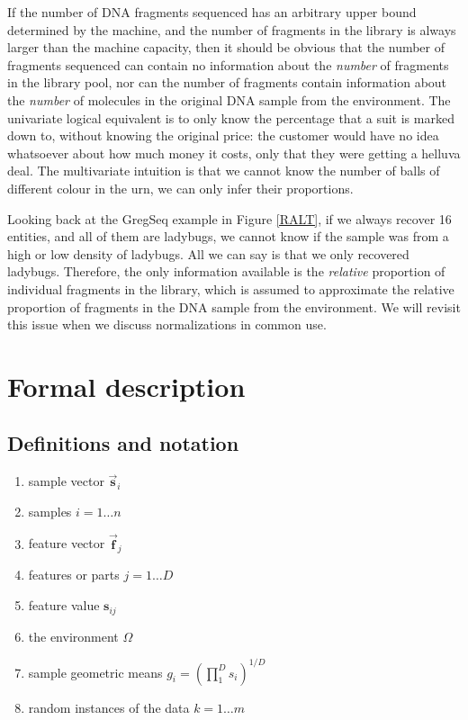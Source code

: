 \documentclass[onecolumn]{book}
\providecommand{\tightlist}{%
  \setlength{\itemsep}{0pt}\setlength{\parskip}{0pt}}
\newcommand{\vect}[1]{\vec{\textbf{#1}}}
\theoremstyle{definition}
\theoremstyle{definition}
\theoremstyle{definition}
\theoremstyle{remark}
\begin{document}
If the number of DNA fragments sequenced has an arbitrary upper bound
determined by the machine, and the number of fragments in the library is
always larger than the machine capacity, then it should be obvious that
the number of fragments sequenced can contain no information about the
\emph{number} of fragments in the library pool, nor can the number of
fragments contain information about the \emph{number} of molecules in
the original DNA sample from the environment. The univariate logical
equivalent is to only know the percentage that a suit is marked down to,
without knowing the original price: the customer would have no idea
whatsoever about how much money it costs, only that they were getting a
helluva deal. The multivariate intuition is that we cannot know the
number of balls of different colour in the urn, we can only infer their
proportions.

Looking back at the GregSeq example in Figure \ref{RALT}, if we always
recover 16 entities, and all of them are ladybugs, we cannot know if the
sample was from a high or low density of ladybugs. All we can say is
that we only recovered ladybugs. Therefore, the only information
available is the \emph{relative} proportion of individual fragments in
the library, which is assumed to approximate the relative proportion of
fragments in the DNA sample from the environment. We will revisit this
issue when we discuss normalizations in common use.

\hypertarget{formal-description}{%
\section{Formal description}\label{formal-description}}

\hypertarget{definitions-and-notation}{%
\subsection{Definitions and notation}\label{definitions-and-notation}}

\begin{enumerate}
\def\labelenumi{\arabic{enumi}.}
\tightlist
\item
  sample vector \(\vect{s}_i\)
\item
  samples \(i=1 \ldots n\)
\item
  feature vector \(\vect{f}_j\)
\item
  features or parts \(j=1 \ldots D\)
\item
  feature value \(\textbf{s}_{ij}\)
\item
  the environment \(\Omega\)
\item
  sample geometric means \(g_i= ( \prod_{1}^{D} s_i )^{1/D}\)
\item
  random instances of the data \(k=1 \ldots m\)
\end{enumerate}
\end{document}
